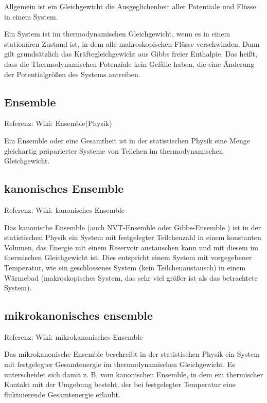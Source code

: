 \documentclass[]{article}
\begin{document}
Allgemein ist ein Gleichgewicht die Ausgeglichenheit aller Potentiale und Flüsse in einem System.
 
Ein System ist im thermodynamischen Gleichgewicht, wenn es in einem stationären Zustand ist, in dem alle makroskopischen Flüsse verschwinden. Dann gilt grundsätzlich das Kräftegleichgewicht aus Gibbs freier Enthalpie. Das heißt, dass die Thermodynamischen Potenziale kein Gefälle haben, die eine Änderung der Potentialgrößen des Systems antreiben.


\subsection{Ensemble}
Referenz: Wiki: Ensemble(Physik) 

Ein Ensemble oder eine Gesamtheit ist in der statistischen Physik eine Menge gleichartig präparierter Systeme von Teilchen im thermodynamischen Gleichgewicht. 

\subsection{kanonisches Ensemble}
Referenz: Wiki: kanonisches Ensemble

Das kanonische Ensemble (auch NVT-Ensemble oder Gibbs-Ensemble ) ist in der statistischen Physik ein System mit festgelegter Teilchenzahl in einem konstanten Volumen, das Energie mit einem Reservoir austauschen kann und mit diesem im thermischen Gleichgewicht ist. Dies entspricht einem System mit vorgegebener Temperatur, wie ein geschlossenes System (kein Teilchenaustausch) in einem Wärmebad (makroskopisches System, das sehr viel größer ist als das betrachtete System).

\subsection{mikrokanonisches ensemble}
Referenz: Wiki: mikrokanonisches Ensemble

Das mikrokanonische Ensemble beschreibt in der statistischen Physik ein System mit festgelegter Gesamtenergie im thermodynamischen Gleichgewicht. Es unterscheidet sich damit z. B. vom kanonischen Ensemble, in dem ein thermischer Kontakt mit der Umgebung besteht, der bei festgelegter Temperatur eine fluktuierende Gesamtenergie erlaubt.
\end{document}
